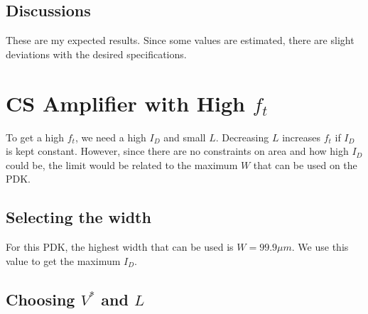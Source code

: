 \documentclass[conference]{IEEEtran}
\begin{document}
\subsection{Discussions}
These are my expected results. Since some values are estimated, there are slight deviations with the desired specifications. 

\vspace{8pt}
\section{CS Amplifier with High $f_t$} 
To get a high $f_t$, we need a high $I_D$ and small $L$. Decreasing $L$ increases $f_t$ if $I_D$
is kept constant. However, since there are no constraints on area and how high $I_D$ could be, the limit would be related to the maximum $W$ that can be used on the PDK. 

\subsection{Selecting the width}
For this PDK, the highest width that can be used is $W=99.9\mu m$. We use this value to get 
the maximum $I_D$. 

\newpage 
\subsection{Choosing $V^*$ and $L$}
\end{document}
